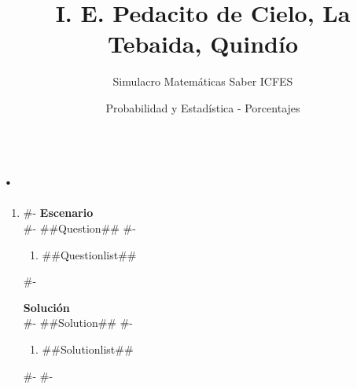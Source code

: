 \documentclass[a4paper,12pt]{article}
\title{I. E. Pedacito de Cielo, La Tebaida, Quindío}
\author{Simulacro Matemáticas Saber ICFES}
\date{Probabilidad y Estadística - Porcentajes}
\begin{document}
\maketitle

\section*{.}


\begin{enumerate}[label=\arabic*.]
#-
  \item
#-
  \textbf{Escenario}\\
#-
  ##Question##
#-
  \begin{enumerate}[label=(\alph*)]
    \item ##Questionlist##
  \end{enumerate}
#-

  \textbf{Solución}\\
#-
  ##Solution##
#-
  \begin{enumerate}[label=(\alph*)]
    \item ##Solutionlist##
  \end{enumerate}
#-
#-
\end{enumerate}
\end{document}
